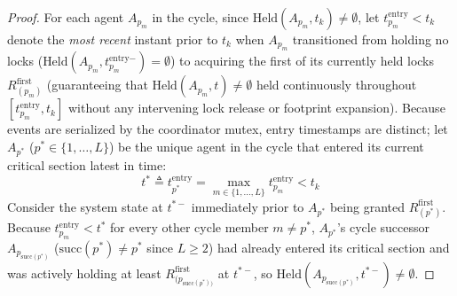 \documentclass[conference,10pt]{IEEEtran}
\begin{document}
\begin{proof}
For each agent $A_{p_m}$ in the cycle, since $\text{Held}(A_{p_m}, t_k) \ne \emptyset$, let $t_{p_m}^{\text{entry}} < t_k$ denote the \textit{most recent} instant prior to $t_k$ when $A_{p_m}$ transitioned from holding no locks ($\text{Held}(A_{p_m}, t_{p_m}^{\text{entry}-}) = \emptyset$) to acquiring the first of its currently held locks $R_{(p_m)}^{\text{first}}$ (guaranteeing that $\text{Held}(A_{p_m}, t) \ne \emptyset$ held continuously throughout $[t_{p_m}^{\text{entry}}, t_k]$ without any intervening lock release or footprint expansion). Because events are serialized by the coordinator mutex, entry timestamps are distinct; let $A_{p^*}$ ($p^* \in \{1, \dots, L\}$) be the unique agent in the cycle that entered its current critical section latest in time:
\begin{equation}
t^* \triangleq t_{p^*}^{\text{entry}} = \max_{m \in \{1, \dots, L\}} t_{p_m}^{\text{entry}} < t_k
\end{equation}
Consider the system state at $t^{*-}$ immediately prior to $A_{p^*}$ being granted $R_{(p^*)}^{\text{first}}$. Because $t_{p_m}^{\text{entry}} < t^*$ for every other cycle member $m \ne p^*$, $A_{p^*}$'s cycle successor $A_{p_{\text{succ}(p^*)}}$ ($\text{succ}(p^*) \ne p^*$ since $L \ge 2$) had already entered its critical section and was actively holding at least $R_{(p_{\text{succ}(p^*))}}^{\text{first}}$ at $t^{*-}$, so $\text{Held}(A_{p_{\text{succ}(p^*)}}, t^{*-}) \ne \emptyset$.


\end{proof}
\end{document}
